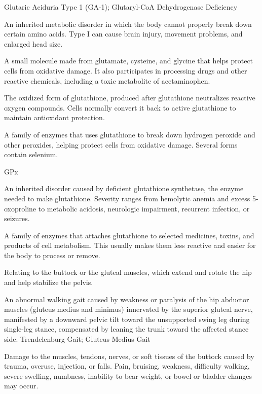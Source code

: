 \synonyms
Glutaric Aciduria Type 1 (GA-1); Glutaryl-CoA Dehydrogenase Deficiency

 An inherited metabolic disorder in which the body cannot properly break down certain amino acids. Type I can cause brain injury, movement problems, and enlarged head size.

 A small molecule made from glutamate, cysteine, and glycine that helps protect cells from oxidative damage. It also participates in processing drugs and other reactive chemicals, including a toxic metabolite of acetaminophen.

 The oxidized form of glutathione, produced after glutathione neutralizes reactive oxygen compounds. Cells normally convert it back to active glutathione to maintain antioxidant protection.

 A family of enzymes that uses glutathione to break down hydrogen peroxide and other peroxides, helping protect cells from oxidative damage. Several forms contain selenium.

\synonyms
GPx

 An inherited disorder caused by deficient glutathione synthetase, the enzyme needed to make glutathione. Severity ranges from hemolytic anemia and excess 5-oxoproline to metabolic acidosis, neurologic impairment, recurrent infection, or seizures.

 A family of enzymes that attaches glutathione to selected medicines, toxins, and products of cell metabolism. This usually makes them less reactive and easier for the body to process or remove.

 Relating to the buttock or the gluteal muscles, which extend and rotate the hip and help stabilize the pelvis.

 An abnormal walking gait caused by weakness or paralysis of the hip abductor muscles (gluteus medius and minimus) innervated by the superior gluteal nerve, manifested by a downward pelvic tilt toward the unsupported swing leg during single-leg stance, compensated by leaning the trunk toward the affected stance side.
\synonyms
Trendelenburg Gait; Gluteus Medius Gait

 Damage to the muscles, tendons, nerves, or soft tissues of the buttock caused by trauma, overuse, injection, or falls. Pain, bruising, weakness, difficulty walking, severe swelling, numbness, inability to bear weight, or bowel or bladder changes may occur.


